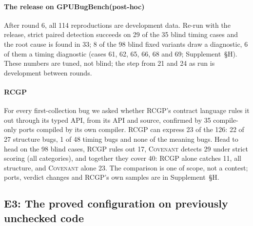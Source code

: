 \documentclass[acmtog,anonymous,review]{acmart}
\newcommand{\sys}{\textsc{Covenant}\xspace}
\newcommand{\rcgp}{RCGP\xspace}
\newcommand{\bench}{GPUBugBench\xspace}
\newcommand{\supp}[1]{Supplement~\S#1}
\begin{document}
\paragraph{The release on \bench (post-hoc)}
After round 6, all 114 reproductions are development data. Re-run with the release, strict paired detection succeeds
on 29 of the 35 blind timing cases and the root cause is found in 33; 8 of the 98 blind fixed variants draw a
diagnostic, 6 of them a timing diagnostic (cases 61, 62, 65, 66, 68 and 69; \supp{H}). These numbers are tuned, not blind; the step from 21 and 24 as run is development between rounds.

\paragraph{\rcgp}
\label{sec:eval-rcgp}
For every first-collection bug we asked whether \rcgp's contract language rules it out through its typed API, from its
API and source, confirmed by 35 compile-only ports compiled by its own compiler. \rcgp can express 23 of the 126: 22
of 27 structure bugs, 1 of 48 timing bugs and none of the meaning bugs. Head to head on the 98 blind cases, \rcgp rules
out 17, \sys detects 29 under strict scoring (all categories), and together they cover 40: \rcgp alone catches 11,
all structure, and \sys alone 23. The comparison is one of scope, not a contest; ports, verdict changes and \rcgp's own
samples are in \supp{H}.

\subsection{E3: The proved configuration on previously unchecked code}
\label{sec:eval-fresh}
\end{document}
